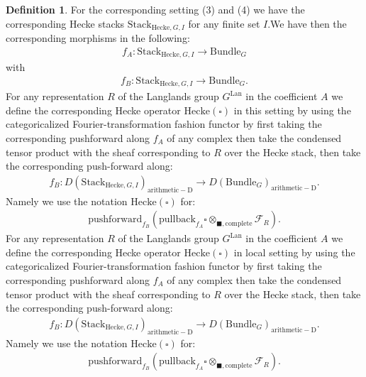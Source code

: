 \documentclass[12pt]{book}
\theoremstyle{definition}
\newtheorem{definition}{Definition}
\begin{document}
\begin{definition}
For the corresponding setting (3) and (4) we have the corresponding Hecke stacks $\mathrm{Stack}_{\mathrm{Hecke},G,I}$ for any finite set $I$.We have then the corresponding morphisms in the following:
\begin{align}
f_A: \mathrm{Stack}_{\mathrm{Hecke},G,I} \rightarrow \mathrm{Bundle}_{G}
\end{align}
with
\begin{align}
f_B: \mathrm{Stack}_{\mathrm{Hecke},G,I} \rightarrow \mathrm{Bundle}_{G}.
\end{align}
For any representation $R$ of the Langlands group $G^\mathrm{Lan}$ in the coefficient $A$ we define the corresponding Hecke operator $\mathrm{Hecke}(\square)$ in this setting by using the categoricalized Fourier-transformation fashion functor by first taking the corresponding pushforward along $f_A$ of any complex then take the condensed tensor product with the sheaf corresponding to $R$ over the Hecke stack, then take the corresponding push-forward along:
\begin{align}
f_B: D(\mathrm{Stack}_{\mathrm{Hecke},G,I})_{\mathrm{arithmetic-D}}\rightarrow D(\mathrm{Bundle}_{G})_{\mathrm{arithmetic-D}}.
\end{align}
Namely we use the notation $\mathrm{Hecke}(\square)$ for:
\begin{align}
\mathrm{pushforward}_{f_B}(\mathrm{pullback}_{f_A}\square\otimes_{\blacksquare,\mathrm{complete}}\mathcal{F}_R).
\end{align}
For any representation $R$ of the Langlands group $G^\mathrm{Lan}$ in the coefficient $A$ we define the corresponding Hecke operator $\mathrm{Hecke}(\square)$ in local setting by using the categoricalized Fourier-transformation fashion functor by first taking the corresponding pushforward along $f_A$ of any complex then take the condensed tensor product with the sheaf corresponding to $R$ over the Hecke stack, then take the corresponding push-forward along:
\begin{align}
f_B: D(\mathrm{Stack}_{\mathrm{Hecke},G,I})_{\mathrm{arithmetic-D}} \rightarrow D(\mathrm{Bundle}_{G})_{\mathrm{arithmetic-D}}.
\end{align}
Namely we use the notation $\mathrm{Hecke}(\square)$ for:
\begin{align}
\mathrm{pushforward}_{f_B}(\mathrm{pullback}_{f_A}\square\otimes_{\blacksquare,\mathrm{complete}}\mathcal{F}_R).
\end{align}

\end{definition}
\end{document}
